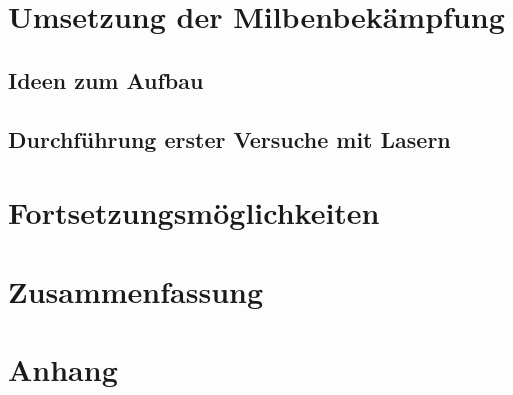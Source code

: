 \documentclass[11pt,a4paper]{article}
\begin{document}
\newpage
\section{Umsetzung der Milbenbekämpfung}
\subsection{Ideen zum Aufbau}

\subsection{Durchführung erster Versuche mit Lasern}




\newpage
\section{Fortsetzungsmöglichkeiten}


\newpage
\section{Zusammenfassung}

\newpage
\section{Anhang}
\end{document}
